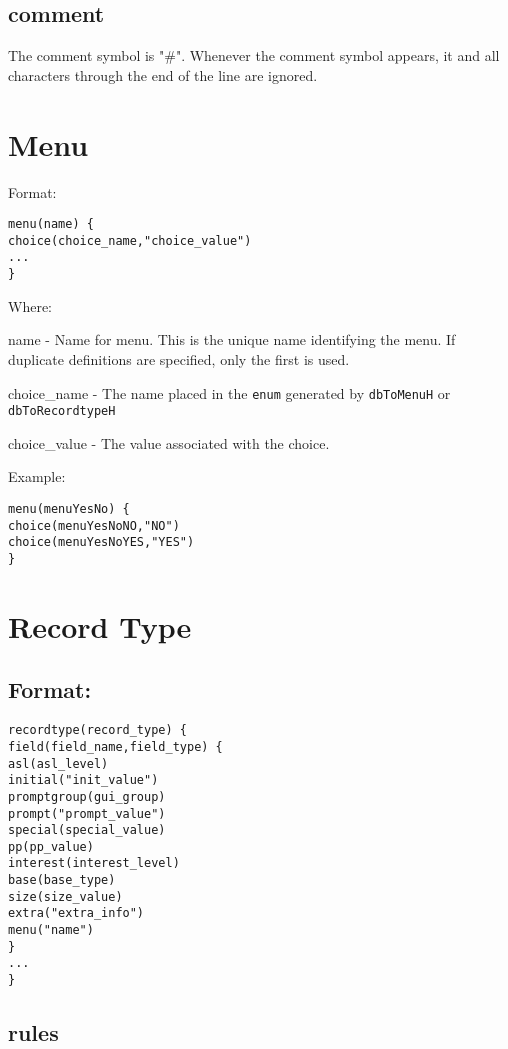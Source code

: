 \subsection{comment}

The comment symbol is "\#". Whenever the comment symbol appears, it and all characters through the end of the line are 
ignored.

\section{Menu}

Format:

\begin{verbatim}menu(name) {
choice(choice_name,"choice_value")
...
}
\end{verbatim}Where:

\begin{description}\item name - Name for menu. This is the unique name identifying the menu. If duplicate definitions are specified, only 
the first is used.

\item choice\_name - The name placed in the \verb|enum| generated by \verb|dbToMenuH| or \verb|dbToRecordtypeH|

\item choice\_value - The value associated with the choice.

\end{description}Example:

\begin{verbatim}menu(menuYesNo) {
choice(menuYesNoNO,"NO")
choice(menuYesNoYES,"YES")
}
\end{verbatim}\section{Record Type}

\subsection{Format:}

\begin{verbatim}recordtype(record_type) {
field(field_name,field_type) {
asl(asl_level)
initial("init_value")
promptgroup(gui_group)
prompt("prompt_value")
special(special_value)
pp(pp_value)
interest(interest_level)
base(base_type)
size(size_value)
extra("extra_info")
menu("name")
}
...
}
\end{verbatim}\subsection{rules}

